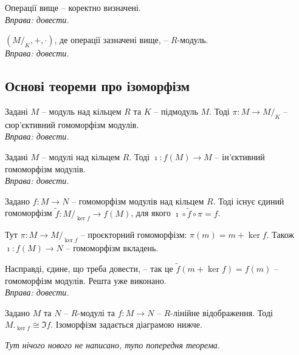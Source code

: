 \documentclass{math_library}
\begin{document}
\begin{lemma}
Операції вище -- коректно визначені.\\
\textit{Вправа: довести.}
\end{lemma}

\begin{theorem}
$(M/_K, +, \cdot)$, де операції зазначені вище, -- $R$-модуль.\\
\textit{Вправа: довести.}
\end{theorem}

\subsection{Основі теореми про ізоморфізм}
\begin{lemma}
Задані $M$ -- модуль над кільцем $R$ та $K$ -- підмодуль $M$. Тоді $\pi \colon M \to M/_K$ -- сюр'єктивний гомоморфізм модулів. \\
\textit{Вправа: довести.}
\end{lemma}

\begin{lemma}
Задані $M$ -- модулі над кільцем $R$. Тоді $\imath \colon f(M) \to M$ -- ін'єктивний гомоморфізм модулів. \\
\textit{Вправа: довести.}
\end{lemma}

\begin{theorem}
Задано $f \colon M \to N$ -- гомоморфізм модулів над кільцем $R$. Тоді існує єдиний гомоморфізм $\tilde{f} \colon M/_{\ker f} \to f(M)$, для якого $\imath \circ \tilde{f} \circ \pi = f$.
\begin{figure}[H]
\centering
{}
\end{figure}
Тут $\pi \colon M \to M/_{\ker f}$ -- проєкторний гомоморфізм: $\pi(m) = m + \ker f$. Також $\imath \colon f(M) \to N$ -- гомоморфізм вкладень.
\end{theorem}
Насправді, єдине, що треба довести, -- так це $\tilde{f}(m + \ker f) = f(m)$ -- гомоморфізм модулів. Решта уже виконано.\\
\textit{Вправа: довести.}

\begin{theorem}
Задано $M$ та $N$ -- $R$-модулі та $f \colon M \to N$ -- $R$-лінійне відображення. Тоді $M._{\ker f} \cong \Im f$. Ізоморфізм задається діаграмою нижче.
\begin{figure}[H]
\centering
{}
\end{figure}
\textit{Тут нічого нового не написано, тупо попередня теорема.}
\end{theorem}
\end{document}
